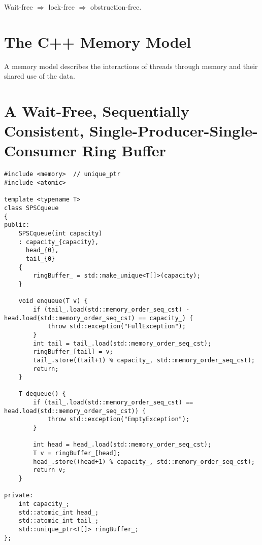 \begin{lemma}
    Wait-free $\Rightarrow$ lock-free $\Rightarrow$ obstruction-free.
\end{lemma}

\section{The C++ Memory Model}
A memory model describes the interactions of threads through memory and their shared use of the data.

\section{A Wait-Free, Sequentially Consistent, Single-Producer-Single-Consumer Ring Buffer}
\makebox[\linewidth]{\rule{17cm}{0.4pt}}
{\centering
\begin{verbatim}
#include <memory>  // unique_ptr
#include <atomic>

template <typename T>
class SPSCqueue
{
public:
    SPSCqueue(int capacity)
    : capacity_{capacity},
      head_{0},
      tail_{0}
    {
        ringBuffer_ = std::make_unique<T[]>(capacity);
    }

    void enqueue(T v) {
        if (tail_.load(std::memory_order_seq_cst) - head.load(std::memory_order_seq_cst) == capacity_) {
            throw std::exception("FullException");
        }
        int tail = tail_.load(std::memory_order_seq_cst);
        ringBuffer_[tail] = v;
        tail_.store((tail+1) % capacity_, std::memory_order_seq_cst);
        return;
    }

    T dequeue() {
        if (tail_.load(std::memory_order_seq_cst) == head.load(std::memory_order_seq_cst)) {
            throw std::exception("EmptyException");
        }

        int head = head_.load(std::memory_order_seq_cst);
        T v = ringBuffer_[head];
        head_.store((head+1) % capacity_, std::memory_order_seq_cst);
        return v;
    }

private:
    int capacity_;
    std::atomic_int head_;
    std::atomic_int tail_;
    std::unique_ptr<T[]> ringBuffer_;
};

\end{verbatim}

}
\makebox[\linewidth]{\rule{17cm}{0.4pt}}
